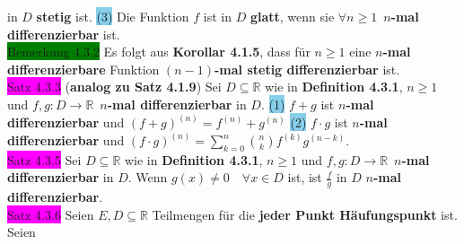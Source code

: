 \documentclass[landscape, 10pt]{article}
\newcommand{\R}{\mathbb{R}}
\begin{document}
\begin{multicols}{3}
                     in \textcolor{NavyBlue}{$D$} \textbf{stetig} ist.
                     \colorbox{SkyBlue}{(3)} Die Funktion \textcolor{NavyBlue}{$f$} 
                     ist in \textcolor{NavyBlue}{$D$} \textbf{glatt}, wenn sie 
                     \textcolor{NavyBlue}{$\forall n\geqslant1$}\,
                     \textbf{$n$-mal differenzierbar} ist.\\
              \colorbox{green}{Bemerkung 4.3.2} 
                     Es folgt aus \textbf{Korollar 4.1.5}, dass für 
                     \textcolor{NavyBlue}{$n\geqslant1$} eine 
                     \textbf{$n$-mal differenzierbare}
                     Funktion \textbf{$(n-1)$-mal 
                     stetig differenzierbar} ist.\\
              \colorbox{magenta}{Satz 4.3.3} 
              (\textbf{analog zu Satz 4.1.9}) 
                     Sei \textcolor{NavyBlue}{$D\subseteq\R$} wie in 
                     \textbf{Definition 4.3.1}, 
                     \textcolor{NavyBlue}{$n\geqslant1$} und 
                     \textcolor{NavyBlue}{$f,g:D\longrightarrow\R$}\,
                     \textbf{$n$-mal 
                     differenzierbar} in \textcolor{NavyBlue}{$D$}. \quad
                     \colorbox{SkyBlue}{(1)} \textcolor{NavyBlue}{$f+g$} 
                     ist $n$\textbf{-mal differenzierbar} und 
                     \textcolor{NavyBlue}{$(f+g)^{(n)}=f^{(n)}+g^{(n)}$}
                     \colorbox{SkyBlue}{(2)} \textcolor{NavyBlue}{$f\cdot g$}
                     ist $n$\textbf{-mal differenzierbar} 
                     und \textcolor{NavyBlue}{
                     $(f\cdot g)^{(n)}=\sum_{k=0}^n\binom{n}{k}f^{(k)}g^{(n-k)}$}.\\
              \colorbox{magenta}{Satz 4.3.5} 
                     Sei \textcolor{NavyBlue}{$D\subseteq\R$} wie in 
                     \textbf{Definition 4.3.1}, 
                     \textcolor{NavyBlue}{$n\geqslant1$} und 
                     \textcolor{NavyBlue}{$f,g:D\longrightarrow\R$}\,
                     \textbf{$n$-mal differenzierbar} in 
                     \textcolor{NavyBlue}{$D$}. Wenn 
                     \textcolor{NavyBlue}{$g(x)\neq0\quad\forall x\in D$} ist, 
                     ist \textcolor{NavyBlue}{$\frac{f}{g}$} 
                     in \textcolor{NavyBlue}{$D$} 
                     $n$\textbf{-mal differenzierbar}. \\
              \colorbox{magenta}{Satz 4.3.6} 
                     Seien \textcolor{NavyBlue}{$E,D\subseteq\R$} Teilmengen 
                     für die \textbf{jeder Punkt Häufungspunkt} ist. Seien 

\end{multicols}
\end{document}
